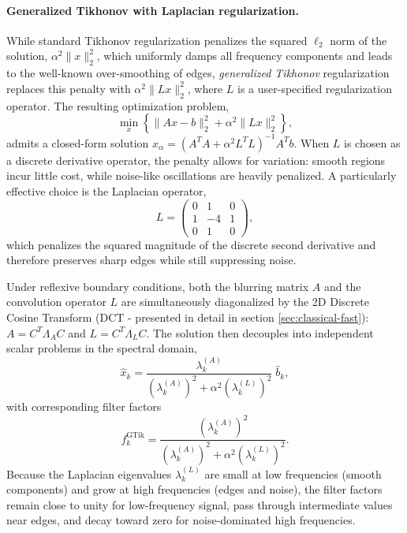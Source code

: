 \documentclass[12pt, a4paper, onecolumn]{article}
\theoremstyle{plain}          %
\theoremstyle{definition}     %
\theoremstyle{remark}
\begin{document}
\paragraph{Generalized Tikhonov with Laplacian regularization.}
While standard Tikhonov regularization penalizes the squared $\ell_2$ norm of the solution, $\alpha^2\|x\|_2^2$, which uniformly damps all frequency components and leads to the well-known over-smoothing of edges, \emph{generalized Tikhonov} regularization replaces this penalty with $\alpha^2\|Lx\|_2^2$, where $L$ is a user-specified regularization operator. The resulting optimization problem,
\begin{equation}
  \min_{x} \left\{ \|Ax - {b}\|_2^2 + \alpha^2 \|Lx\|_2^2 \right\},
\end{equation}
admits a closed-form solution $x_{\alpha} = (A^TA + \alpha^2 L^TL)^{-1}A^T{b}$. When $L$ is chosen as a discrete derivative operator, the penalty allows for variation: smooth regions incur little cost, while noise-like oscillations are heavily penalized. A particularly effective choice is the Laplacian operator,
\begin{equation}
    L = \begin{pmatrix} 0 & 1 & 0 \\ 1 & -4 & 1 \\ 0 & 1 & 0 \end{pmatrix},
\end{equation}
which penalizes the squared magnitude of the discrete second derivative and therefore preserves sharp edges while still suppressing noise.

Under reflexive boundary conditions, both the blurring matrix $A$ and the convolution operator $L$ are simultaneously diagonalized by the 2D Discrete Cosine Transform (DCT - presented in detail in section \ref{sec:classical-fast}): $A = C^T\Lambda_A C$ and $L = C^T\Lambda_L C$. The solution then decouples into independent scalar problems in the spectral domain,
\begin{equation}
    \hat{x}_k = \frac{\lambda_k^{(A)}}{\left(\lambda_k^{(A)}\right)^2 + \alpha^2 \left(\lambda_k^{(L)}\right)^2}\;\hat{b}_k,
\end{equation}
with corresponding filter factors
\begin{equation}
    f_k^{\text{GTik}} = \frac{\left(\lambda_k^{(A)}\right)^2}{\left(\lambda_k^{(A)}\right)^2 + \alpha^2 \left(\lambda_k^{(L)}\right)^2}.
\end{equation}
Because the Laplacian eigenvalues $\lambda_k^{(L)}$ are small at low frequencies (smooth components) and grow at high frequencies (edges and noise), the filter factors remain close to unity for low-frequency signal, pass through intermediate values near edges, and decay toward zero for noise-dominated high frequencies.
\end{document}
